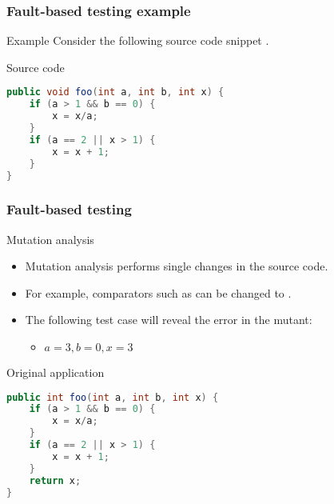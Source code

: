 \begin{frame}[hasprev=false, hasnext=true, fragile]
\frametitle{Fault-based testing example}
\label{example:fault-based-testing}

\begin{block}{Example}
Consider the following source code snippet \cite[p. 45]{myers:2004}.
\end{block}

\begin{block}{Source code}
\vspace{-.15cm}
\begin{lstlisting}[language=java]
public void foo(int a, int b, int x) {
	if (a > 1 && b == 0) {
		x = x/a;
	}
	if (a == 2 || x > 1) {
		x = x + 1;
	}
}
\end{lstlisting}
\end{block}
\end{frame}


\begin{frame}[hasprev=true, hasnext=true, fragile]
\frametitle{Fault-based testing}

\begin{block}{Mutation analysis}
\begin{itemize}
	\item Mutation analysis performs single changes in the source code.

	\item For example, comparators such as \srccode{==} can be changed to
	\srccode{!=}.

	\item The following test case will reveal the error in the mutant:
	\begin{itemize}
		\item $a = 3, b = 0, x = 3$
	\end{itemize}
\end{itemize}
\end{block}

\begin{block}{Original application}
\vspace{-.20cm}
\begin{lstlisting}[language=java]
public int foo(int a, int b, int x) {
	if (a > 1 && b == 0) {
		x = x/a;
	}
	if (a == 2 || x > 1) {
		x = x + 1;
	}
	return x;
}
\end{lstlisting}
\end{block}
\end{frame}


